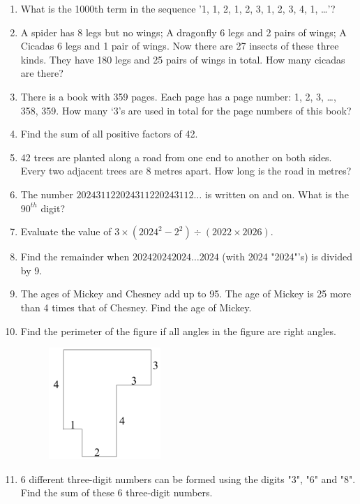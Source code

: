 \documentclass[11pt]{scrartcl}
\begin{document}
\begin{enumerate}
    \item  What is the 1000th term in the sequence '1, 1, 2, 1, 2, 3, 1, 2, 3, 4, 1, \ldots'?

    

    \item  A spider has 8 legs but no wings; A dragonfly 6 legs and 2 pairs of wings; A Cicadas 6 legs and 1 pair of wings. Now there are 27 insects of these three kinds. They have 180 legs and 25 pairs of wings in total. How many cicadas are there?
    
    \item  There is a book with 359 pages. Each page has a page number: 1, 2, 3, \ldots, 358, 359. How many ‘3’s are used in total for the page numbers of this book? 

    \item Find the sum of all positive factors of 42.
     \item 42 trees are planted along a road from one end to another on both sides. Every two adjacent trees are 8 metres apart. How long is the road in metres?
     \item The number $202431122024311220243112\ldots$ is written on and on. What is the $90^{th}$ digit?
     \item Evaluate the value of $3 \times (2024^2 - 2^2) \div (2022 \times 2026)$.
     \item Find the remainder when $202420242024\ldots2024$ (with 2024 "2024"'s) is divided by 9. 
     \item The ages of Mickey and Chesney add up to 95. The age of Mickey is 25 more than 4 times that of Chesney. Find the age of Mickey.
     \item Find the perimeter of the figure if all angles in the figure are right angles. 
    \begin{figure}[h]
        \centering
        \includegraphics[width=0.4\textwidth]{StarGen/0Figure/perim.png}
    \end{figure}
     \item 6 different three-digit numbers can be formed using the digits "3", "6" and "8". Find the sum of these 6 three-digit numbers.


\end{enumerate}
\end{document}

